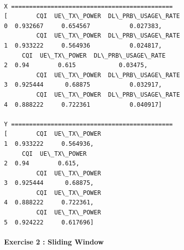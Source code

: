 \documentclass[11pt]{article}
\begin{document}
    \begin{Verbatim}[commandchars=\\\{\}]

X =============================================
[        CQI  UE\_TX\_POWER  DL\_PRB\_USAGE\_RATE
0  0.932667     0.654567           0.027383,
         CQI  UE\_TX\_POWER  DL\_PRB\_USAGE\_RATE
1  0.933222     0.564936           0.024817,
     CQI  UE\_TX\_POWER  DL\_PRB\_USAGE\_RATE
2  0.94        0.615            0.03475,
         CQI  UE\_TX\_POWER  DL\_PRB\_USAGE\_RATE
3  0.925444      0.68875           0.032917,
         CQI  UE\_TX\_POWER  DL\_PRB\_USAGE\_RATE
4  0.888222     0.722361           0.040917]

Y =============================================
[        CQI  UE\_TX\_POWER
1  0.933222     0.564936,
     CQI  UE\_TX\_POWER
2  0.94        0.615,
         CQI  UE\_TX\_POWER
3  0.925444      0.68875,
         CQI  UE\_TX\_POWER
4  0.888222     0.722361,
         CQI  UE\_TX\_POWER
5  0.924222     0.617696]

    \end{Verbatim}

    \hypertarget{exercise-2-sliding-window}{%
\paragraph{Exercise 2 : Sliding
Window}\label{exercise-2-sliding-window}}
\end{document}
